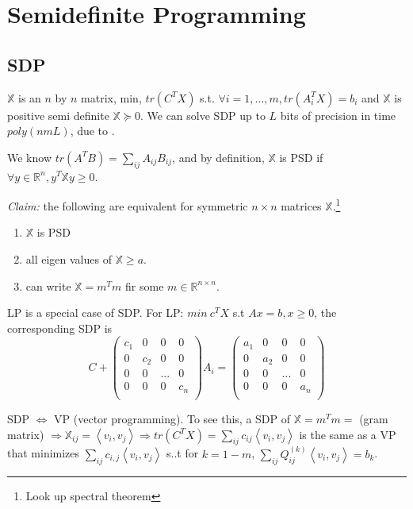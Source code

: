 \documentclass[11pt]{article}
\newcommand{\inprod}[1]{\left\langle #1 \right\rangle}
\begin{document}
\section{Semidefinite Programming}
\subsection{SDP}

$\mathbb{X}$ is an $n$ by $n$ matrix, min, $tr(C^TX)$ s.t. $\forall i=1,...,m, tr(A_i^TX) = b_i$ and $\mathbb{X}$ is positive semi definite $\mathbb{X} \succeq 0$. We can solve SDP up to $L$ bits of precision in time $poly(nmL)$, due to \cite{SDP}.

We know $tr(A^TB) = \sum_{ij}A_{ij}B_{ij}$, and by definition, $\mathbb{X}$ is PSD if $\forall y \in \mathbb{R}^n, y^T \mathbb{X} y \ge 0$.

{\em Claim:} the following are equivalent for symmetric $n\times n$ matrices $\mathbb{X}$.\footnote{Look up spectral theorem}

\begin{enumerate}
\item $\mathbb{X}$ is PSD
\item all eigen values of $\mathbb{X} \ge a$. 
\item can write $\mathbb{X} = m^Tm$ fir some $m \in \mathbb{R}^{n\times n}$.
\end{enumerate}

LP is a special case of SDP. For LP:  $min~c^TX$ s.t $Ax = b, x\ge 0$, the corresponding SDP is
$$C + \left( \begin{array}{cccc}
c_1 & 0 & 0 & 0\\
0 & c_2 & 0 & 0\\
0 & 0 & ...& 0\\
0 & 0 & 0 & c_n \\
 \end{array} \right) A_i=\left( \begin{array}{cccc}
a_1 & 0 & 0 & 0\\
0 & a_2 & 0 & 0\\
0 & 0 & ...& 0\\
0 & 0 & 0 & a_n \\
 \end{array} \right) $$

SDP $\iff$ VP (vector programming). To see this, a SDP of $\mathbb{X} = m^Tm = $ (gram matrix) $\Rightarrow \mathbb{X}_{ij} = \inprod{v_i,v_j} \Rightarrow tr(C^TX) = \sum_{ij} c_{ij} \inprod{v_i,v_j}$ is the same as a VP that minimizes $\sum_{ij}c_{i,j}\inprod{v_i,v_j}$ s..t for $k=1-m$, $\sum_{ij} Q_{ij}^{(k)} \inprod{v_i,v_j} = b_k$.
\end{document}
